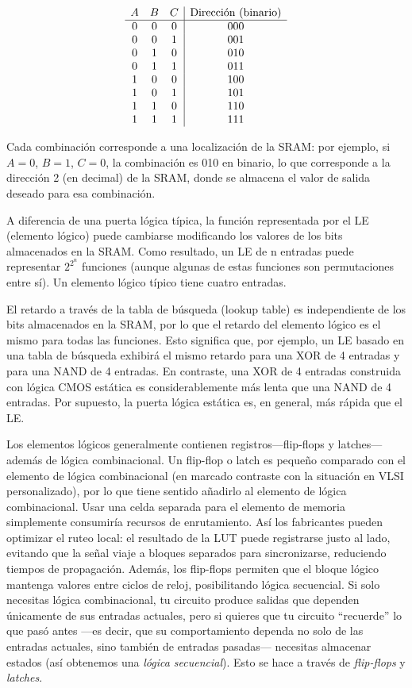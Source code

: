 \[
\begin{array}{c c c | c}
A & B & C & \text{Dirección (binario)} \\
\hline
0 & 0 & 0 & 000 \\
0 & 0 & 1 & 001 \\
0 & 1 & 0 & 010 \\
0 & 1 & 1 & 011 \\
1 & 0 & 0 & 100 \\
1 & 0 & 1 & 101 \\
1 & 1 & 0 & 110 \\
1 & 1 & 1 & 111 \\
\end{array}
\]

Cada combinación corresponde a una localización de la SRAM: por ejemplo, si $A=0$, $B=1$, $C=0$, la combinación es 010 en binario, lo que corresponde a la dirección 2 (en decimal) de la SRAM, donde se almacena el valor de salida deseado para esa combinación.


A diferencia de una puerta lógica típica, la función representada por el LE (elemento lógico) puede cambiarse modificando los valores de los bits almacenados en la SRAM. Como resultado, un LE de n entradas puede representar $2^{2^n}$ funciones (aunque algunas de estas funciones son permutaciones entre sí). Un elemento lógico típico tiene cuatro entradas.

El retardo a través de la tabla de búsqueda (lookup table) es independiente de los bits almacenados en la SRAM, por lo que el retardo del elemento lógico es el mismo para todas las funciones. Esto significa que, por ejemplo, un LE basado en una tabla de búsqueda exhibirá el mismo retardo para una XOR de 4 entradas y para una NAND de 4 entradas. En contraste, una XOR de 4 entradas construida con lógica CMOS estática es considerablemente más lenta que una NAND de 4 entradas. Por supuesto, la puerta lógica estática es, en general, más rápida que el LE.

Los elementos lógicos generalmente contienen registros—flip-flops y latches—además de lógica combinacional. Un flip-flop o latch es pequeño comparado con el elemento de lógica combinacional (en marcado contraste con la situación en VLSI personalizado), por lo que tiene sentido añadirlo al elemento de lógica combinacional. Usar una celda separada para el elemento de memoria simplemente consumiría recursos de enrutamiento. Así los fabricantes pueden optimizar el ruteo local: el resultado de la LUT puede registrarse justo al lado, evitando que la señal viaje a bloques separados para sincronizarse, reduciendo tiempos de propagación. Además, los flip-flops permiten que el bloque lógico mantenga valores entre ciclos de reloj, posibilitando lógica secuencial. Si solo necesitas lógica combinacional, tu circuito produce salidas que dependen únicamente de sus entradas actuales, pero si quieres que tu circuito “recuerde” lo que pasó antes —es decir, que su comportamiento dependa no solo de las entradas actuales, sino también de entradas pasadas— necesitas almacenar estados (así obtenemos una \textit{lógica secuencial}). Esto se hace a través de \textit{flip-flops} y \textit{latches}.


